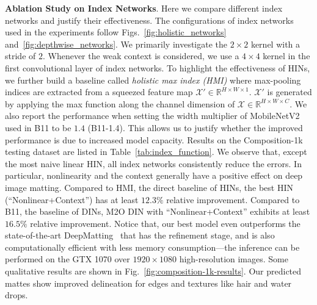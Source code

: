 \documentclass[10pt,twocolumn,letterpaper]{article}
\begin{document}
\vspace{3pt}
\noindent\textbf{Ablation Study on Index Networks}. Here we compare different index networks and justify their effectiveness. The configurations of index networks used in the experiments follow Figs.~\ref{fig:holistic_networks} and~\ref{fig:depthwise_networks}. We primarily investigate the $2\times2$ kernel with a stride of $2$. Whenever the weak context is considered, we use a $4\times4$ kernel in the first convolutional layer of index networks. To highlight the effectiveness of HINs, we further build a baseline called \textit{holistic max index (HMI)} where max-pooling indices are extracted from a squeezed feature map $\mathcal{X}'\in\mathbb{R}^{H\times W\times1}$. $\mathcal{X}'$ is generated by applying the max function along the channel dimension of $\mathcal{X}\in\mathbb{R}^{H\times W\times C}$. We also report the performance when setting the width multiplier of MobileNetV2 used in B11 to be $1.4$ (B11-1.4). This allows us to justify whether the improved performance is due to increased model capacity.
Results on the \mbox{Composition-1k} testing dataset are listed in Table~\ref{tab:index_function}. We observe that, except the most naive linear HIN, all index networks consistently reduce the errors. In particular, nonlinearity and the context generally have a positive effect on deep image matting. Compared to HMI, the direct baseline of HINs, the best HIN (``Nonlinear+Context'') has at least $12.3\%$ relative improvement. Compared to B11, the baseline of DINs, M2O DIN with ``Nonlinear+Context'' exhibits at least $16.5\%$ relative improvement. Notice that, our best model even outperforms the state-of-the-art DeepMatting~\cite{xu2017deep} that has the refinement stage, and is also computationally efficient with less memory consumption---the inference can be performed on the GTX 1070 over $1920\times1080$ high-resolution images. Some qualitative results are shown in Fig.~\ref{fig:composition-1k-results}. Our predicted mattes show improved delineation for edges and textures like hair and water drops.
\end{document}
